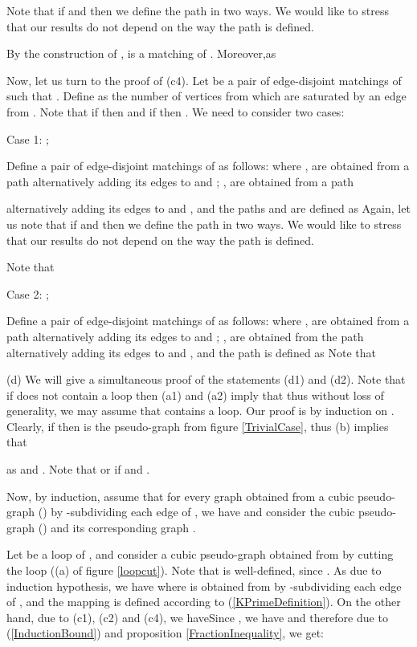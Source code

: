 \documentclass[fleqn,12pt,twoside]{article}
\newenvironment{proof}[1][Proof.]{\begin{trivlist}
\item[\hskip \labelsep {\bfseries #1}]}{\end{trivlist}}
\begin{document}
\begin{proof}
Note that if  and  then we define the path
 in two ways. We would like to stress that our
results do not depend on the way the path  is
defined.

By the construction of ,  is a matching of . Moreover,as

Now, let us turn to the proof of (c4). Let  be a pair of edge-disjoint matchings of  such that . Define  as the number of vertices from  which
are saturated by an edge from . Note that if  then 
and if  then . We need to consider two
cases:

Case 1: ;

Define a pair of edge-disjoint matchings  of  as follows:
where , are obtained from a path  alternatively adding its edges to  and ; , are obtained from a path

alternatively adding its edges to  and , and the paths  and  are defined as
Again, let us note that if  and  then we define the
path  in two ways. We would like to stress that
our results do not depend on the way the path  is
defined.

Note that


Case 2: ;

Define a pair of edge-disjoint matchings  of  as follows:
where , are obtained from a path 
alternatively
adding its edges to  and ; , are obtained from the path  alternatively adding its edges to  and , and the path  is defined as
Note that

(d) We will give a simultaneous proof of the statements (d1) and
(d2). Note that if  does not contain a loop then (a1) and
(a2) imply that
thus without loss of generality, we may assume that  contains
a loop. Our proof is by induction on . Clearly, if  then
 is the pseudo-graph from figure \ref{TrivialCase}, thus (b)
implies that


as  and . Note that  or  if  and .

Now, by induction, assume that for every graph 
obtained from a cubic pseudo-graph  ()
by -subdividing each edge 
of , we have
and consider the cubic pseudo-graph  () and its
corresponding graph .

Let  be a loop of , and consider a cubic pseudo-graph  obtained from  by cutting the loop 
((a) of figure \ref{loopcut}). Note that  is
well-defined, since . As  due to induction
hypothesis, we have
where  is obtained from  by -subdividing each edge  of
,
and the mapping  is defined according to (\ref{KPrimeDefinition}). On the other hand, due to (c1), (c2) and (c4), we haveSince ,  we have
and therefore due to (\ref{InductionBound}) and proposition \ref {FractionInequality}, we get:



\end{proof}
\end{document}

